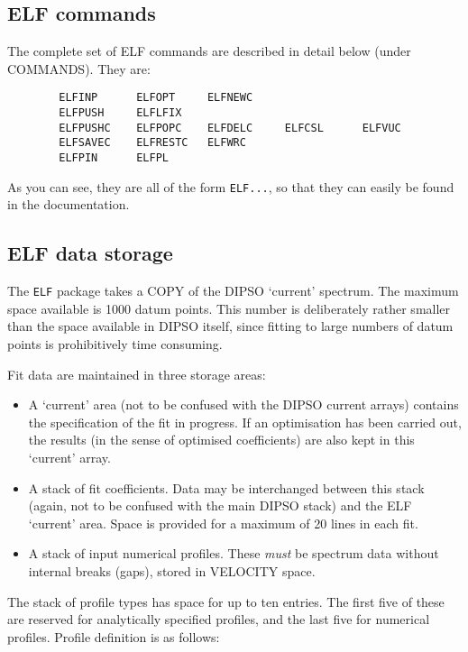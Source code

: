 \subsection {ELF commands}

The complete set of ELF commands are described in detail below (under
COMMANDS). They are:

\begin{verbatim}
        ELFINP      ELFOPT     ELFNEWC
        ELFPUSH     ELFLFIX
        ELFPUSHC    ELFPOPC    ELFDELC     ELFCSL      ELFVUC
        ELFSAVEC    ELFRESTC   ELFWRC
        ELFPIN      ELFPL
\end{verbatim}

As you can see, they are all of the form {\tt ELF...}, so that they can
easily be found in the documentation.

\subsection {ELF data storage}

The {\tt ELF} package takes a COPY of the DIPSO `current' spectrum.
The maximum space available is 1000 datum points.
This number is deliberately rather smaller than the space available in DIPSO
itself, since fitting to large numbers of datum points is prohibitively time
consuming.

Fit data are maintained in three storage areas:

\begin{itemize}

\item A `current' area (not to be confused with the DIPSO current
arrays) contains the specification of the fit in progress. If an
optimisation has been carried out, the results (in the sense of
optimised coefficients) are also kept in this `current' array.

\item A stack of fit coefficients. Data may be interchanged between
this stack (again, not to be confused with the main DIPSO stack) and
the ELF `current' area. Space is provided for a maximum of 20 lines in
each fit.

\item A stack of input numerical profiles. These {\em must} be
spectrum data without internal breaks (gaps), stored in VELOCITY
space.

\end{itemize}

The stack of profile types has space for up to ten entries. The first
five of these are reserved for analytically specified profiles, and
the last five for numerical profiles. Profile definition is as
follows:

